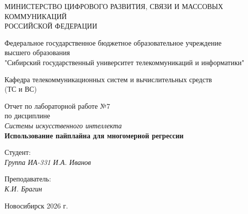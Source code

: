 \thispagestyle{empty}

\begin{center}
    МИНИСТЕРСТВО ЦИФРОВОГО РАЗВИТИЯ, СВЯЗИ И МАССОВЫХ КОММУНИКАЦИЙ \\ РОССИЙСКОЙ ФЕДЕРАЦИИ
    
    \vspace{20pt}
    
    Федеральное государственное бюджетное образовательное учреждение \\ высшего образования \\
    "Сибирский государственный университет телекоммуникаций и информатики" \\
    
    \vspace{20pt}
    
    Кафедра телекоммуникационных систем и вычислительных средств \\ (ТС и ВС)
\end{center}

\vfill

\begin{center}
    Отчет по лабораторной работе №7 \\
    по дисциплине \\
    \textit{Системы искусственного интеллекта} \\
    \vspace{10pt}
    \textbf{Использование пайплайна для многомерной регрессии}
    \vspace{20pt}
\end{center}

\vfill

\noindent Студент: \\
\textit{Группа ИА-331 \hfill И.А. Иванов}

\vspace{20pt}

\noindent Преподаватель: \\
\textit{\hfill К.И. Брагин}

\vfill

\begin{center}
    Новосибирск 2026 г.
\end{center}
